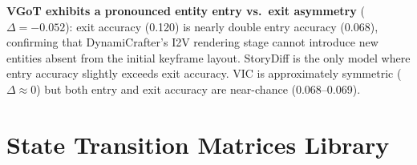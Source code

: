 \documentclass[sigconf,review,anonymous]{acmart}
\begin{document}
\textbf{VGoT exhibits a pronounced entity entry vs.\ exit asymmetry} ($\Delta = -0.052$): exit accuracy (0.120) is nearly double entry accuracy (0.068), confirming that DynamiCrafter's I2V rendering stage cannot introduce new entities absent from the initial keyframe layout.
StoryDiff is the only model where entry accuracy slightly exceeds exit accuracy.
VIC is approximately symmetric ($\Delta \approx 0$) but both entry and exit accuracy are near-chance (0.068--0.069).


\section{State Transition Matrices Library}
\label{app:delta_s}
\end{document}
